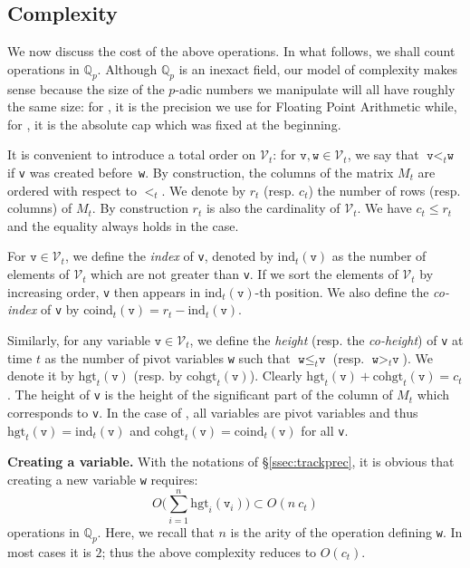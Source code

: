 \documentclass[sigconf]{acmart}
\newcommand{\Q}{\mathbb Q}
\newcommand{\Qp}{\Q_p}
\newcommand{\calV}{\mathcal{V}}
\newcommand{\ttv}{\texttt{v}\xspace}
\newcommand{\ttw}{\texttt{w}\xspace}
\newcommand{\ZpLC}{\text{\color{output} \rm \tt ZpLC}\xspace}
\newcommand{\ZpLF}{\text{\color{output} \rm \tt ZpLF}\xspace}
\newcommand{\ind}{\text{ind}}
\newcommand{\coind}{\text{coind}}
\newcommand{\hgt}{\text{hgt}}
\newcommand{\cohgt}{\text{cohgt}}
\theoremstyle{definition}
\begin{document}
\subsection{Complexity}
\label{ssec:complexity}

We now discuss the cost of the above operations.
In what follows, we shall count operations in $\Qp$. Although $\Qp$
is an inexact field, our model of complexity makes sense because the
size of the $p$-adic numbers we manipulate will all have roughly the
same size: for \ZpLF, it is the precision we use for Floating Point 
Arithmetic while, for \ZpLC, it is the absolute cap which
was fixed at the beginning.

It is convenient to introduce a total order on $\calV_t$: for $\ttv, 
\ttw \in \calV_t$, we say that $\ttv <_t \ttw$ if \ttv was created 
before~\ttw. By construction, the columns of the matrix $M_t$ are 
ordered with respect to $<_t$. We denote by $r_t$ (resp. $c_t$) the
number of rows (resp. columns) of $M_t$. By construction $r_t$ is
also the cardinality of $\calV_t$. We have $c_t \leq r_t$ and the 
equality always holds in the \ZpLC case.

For $\ttv \in \calV_t$, we define the \emph{index} of \ttv, denoted by 
$\ind_t(\ttv)$ as the number of elements of $\calV_t$ which are not 
greater than \ttv. If we sort the elements of $\calV_t$ by increasing 
order, \ttv then appears in $\ind_t(\ttv)$-th position.
We also define the \emph{co-index} of \ttv by
$\coind_t(\ttv) = r_t - \ind_t(\ttv)$.

Similarly, for any variable $\ttv \in \calV_t$, we define the 
\emph{height} (resp. the \emph{co-height}) of \ttv at time $t$ as the 
number of pivot variables \ttw such that $\ttw \leq_t \ttv$ (resp. 
$\ttw >_t \ttv$). We denote it by $\hgt_t(\ttv)$ (resp. by 
$\cohgt_t(\ttv)$). Clearly $\hgt_t(\ttv) + \cohgt_t(\ttv) = c_t$.
The height of \ttv is the height of the significant 
part of the column of $M_t$ which corresponds to \ttv. In the case of
\ZpLC, all variables are pivot variables and thus $\hgt_t(\ttv) = 
\ind_t(\ttv)$ and $\cohgt_t(\ttv) = \coind_t(\ttv)$ for all \ttv.

\medskip

\noindent \textbf{Creating a variable.}
%
With the notations of \S \ref{ssec:trackprec}, it is obvious that 
creating a new variable \ttw requires:
$$O\bigg(\sum_{i=1}^n \hgt_i(\ttv_i)\bigg) \subset O(n \: c_t)$$ 
operations in $\Qp$. Here, we recall that $n$ is the arity of the 
operation defining \ttw. In most cases it is $2$; thus the above
complexity reduces to $O(c_t)$.
\end{document}
